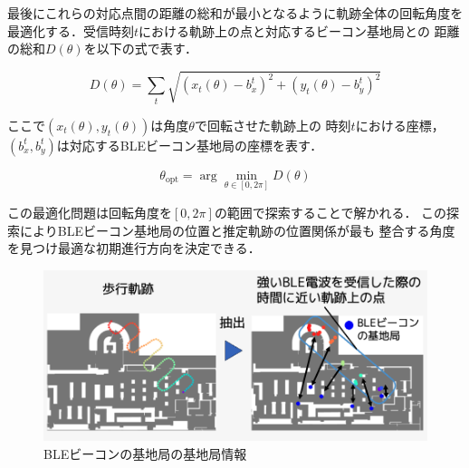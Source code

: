 最後にこれらの対応点間の距離の総和が最小となるように軌跡全体の回転角度を
最適化する．受信時刻$t$における軌跡上の点と対応するビーコン基地局との
距離の総和$D(\theta)$を以下の式で表す．

\begin{equation}
D(\theta) = \sum_{t} \sqrt{(x_t(\theta) - b_x^t)^2 + (y_t(\theta) - b_y^t)^2}
\end{equation}

ここで$(x_t(\theta), y_t(\theta))$は角度$\theta$で回転させた軌跡上の
時刻$t$における座標，$(b_x^t, b_y^t)$は対応するBLEビーコン基地局の座標を表す．

\begin{equation}
\theta_{\mathrm{opt}} = \arg\min_{\theta \in [0, 2\pi]} D(\theta)
\end{equation}

この最適化問題は回転角度を$[0, 2\pi]$の範囲で探索することで解かれる．
この探索によりBLEビーコン基地局の位置と推定軌跡の位置関係が最も
整合する角度を見つけ最適な初期進行方向を決定できる．

\begin{figure}[H]
	\centering
	\includegraphics[width=\linewidth]{../image/ble-merge.jpg}
	\caption{BLEビーコンの基地局の基地局情報}    \label{fig:ble-merge}
\end{figure}







